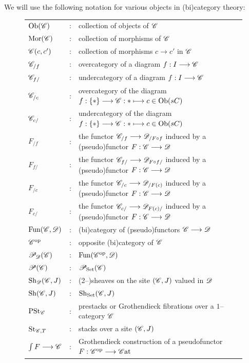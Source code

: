 \documentclass[11pt]{amsart}
\begin{document}
\begin{notn}
We will use the following notation for various objects in (bi)category theory:
\begin{figure}[H]
\begin{tabularx}{\textwidth}{l c l}
$\Ob{\sC}$ & : & collection of objects of $\mathscr{C}$ \\
$\Mor{\sC}$ & : & collection of morphisms of $\mathscr{C}$ \\
$\mathscr{C}(c, c')$ & : & collection of morphisms $c \to c'$ in $\mathscr{C}$ \\
$\mathscr{C}_{/f}$ & : & overcategory of a diagram $f : I \to \sC$ \\
$\mathscr{C}_{f/}$ & : & undercategory of a diagram $f : I \to \sC$ \\
$\mathscr{C}_{/c}$ & : & overcategory of the diagram $f : \set{*} \to \sC : * \mapsto c \in \Ob{sC}$ \\
$\mathscr{C}_{c/}$ & : & undercategory of the diagram $f : \set{*} \to \sC : * \mapsto c \in \Ob{sC}$ \\
$F_{/f}$ & : & the functor $\sC_{/f} \to \sD_{/F \circ f}$
               induced by a (pseudo)functor $F : \sC \to \sD$ \\
$F_{f/}$ & : & the functor $\sC_{f/} \to \sD_{F \circ f/}$
               induced by a (pseudo)functor $F : \sC \to \sD$ \\
$F_{/c}$ & : & the functor $\sC_{/c} \to \sD_{/F(c)}$
               induced by a (pseudo)functor $F : \sC \to \sD$ \\
$F_{c/}$ & : & the functor $\sC_{c/} \to \sD_{F(c)/}$
               induced by a (pseudo)functor $F : \sC \to \sD$ \\
$\mathrm{Fun}(\mathscr{C}, \mathscr{D})$ & : & (bi)category of (pseudo)functors $\sC \to \sD$ \\
$\mathscr{C}^{\mathrm{op}}$ & : & opposite (bi)category of $\mathscr{C}$ \\
$\mathscr{P}_\mathscr{D}(\mathscr{C})$ & : & $\mathrm{Fun}(\mathscr{C}^{\mathrm{op}}, \mathscr{D})$ \\
$\mathscr{P}(\mathscr{C})$ & : & $\mathscr{P}_{\mathrm{Set}}(\mathscr{C})$ \\
$\mathrm{Sh}_\mathscr{D}(\mathscr{C}, J)$ & : & (2--)sheaves on the site $(\mathscr{C}, J)$ valued in $\mathscr{D}$ \\
$\mathrm{Sh}(\mathscr{C}, J)$ & : & $\mathrm{Sh}_{\mathrm{Set}}(\mathscr{C}, J)$ \\
$\mathrm{PSt}_{\mathscr{C}}$ & : & prestacks or Grothendieck fibrations over a $1$--category $\mathscr{C}$ \\
$\mathrm{St}_{\mathscr{C}, T}$ & : & stacks over a site $(\mathscr{C}, J)$ \\
$\int F \to \sC$ & : & Grothendieck construction of a pseudofunctor $F : \sC^\op \to \Cat$ \\
\end{tabularx}
\end{figure}
\end{notn}
\end{document}
